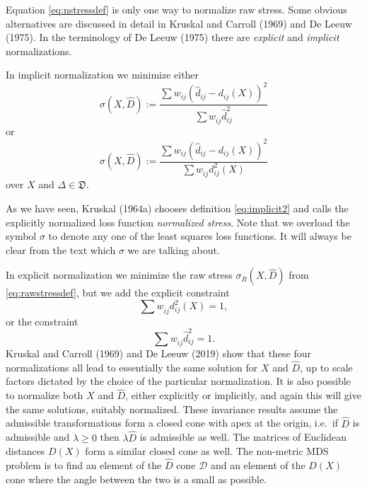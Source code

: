 \documentclass[
  12pt,
]{article}
\begin{document}
Equation \eqref{eq:nstressdef} is only one way to normalize raw stress.
Some obvious alternatives are discussed in detail in
Kruskal and Carroll (1969) and De Leeuw (1975). In the terminology of
De Leeuw (1975) there are \emph{explicit} and \emph{implicit} normalizations.

In implicit normalization we minimize either
\begin{equation}
\sigma(X,\hat D):=\frac{\sum  w_{ij}(\hat d_{ij} -d_{ij}(X))^2}{\sum   w_{ij}^{\ }\hat d_{ij}^2}
\label{eq:implicit1}
\end{equation}
or
\begin{equation}
\sigma(X,\hat D):=\frac{\sum   w_{ij}(\hat d_{ij}-d_{ij}(X))^2}{\sum   w_{ij}^{\ }d_{ij}^2(X) }
\label{eq:implicit2}
\end{equation}
over \(X\) and \(\Delta\in\mathfrak{D}\).

As we have seen, Kruskal (1964a) chooses definition \eqref{eq:implicit2} and
calls the explicitly normalized loss function \emph{normalized stress}. Note that we overload the symbol \(\sigma\) to denote any one of the least squares loss
functions. It will always be clear from the text which \(\sigma\) we are
talking about.

In explicit normalization we minimize the raw stress \(\sigma_R(X,\hat D)\)
from \eqref{eq:rawstressdef}, but we add the explicit constraint
\begin{equation}
\sum   w_{ij}^{\ }d_{ij}^2(X)=1,
\label{eq:explicit1}
\end{equation}
or the constraint
\begin{equation}
\sum   w_{ij}^{\ }\hat d_{ij}^2=1.
\label{eq:explicit2}
\end{equation}
Kruskal and Carroll (1969) and De Leeuw (2019) show that these
four normalizations all lead to essentially the same solution for \(X\)
and \(\hat D\), up to scale factors dictated by the choice of the particular
normalization. It is also possible to normalize both \(X\) and \(\hat D\),
either explicitly or implicitly, and again this will give the same
solutions, suitably normalized. These invariance results assume the
admissible transformations form a closed cone with apex at the origin,
i.e.~if \(\hat D\) is admissible and \(\lambda\geq 0\) then \(\lambda\hat D\)
is admissible as well. The matrices of Euclidean distances \(D(X)\) form a
similar closed cone as well. The non-metric MDS problem is to find an element
of the \(\hat D\) cone \(\mathcal{D}\) and an element of the \(D(X)\) cone where the angle between the two is a small as possible.
\end{document}
